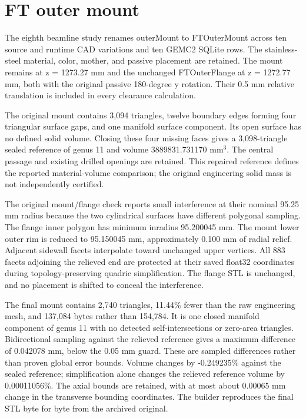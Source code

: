 \FloatBarrier
\section{FT outer mount}
\label{sec:outer-mount}

The eighth beamline study renames outerMount to FTOuterMount across ten source and runtime CAD variations
and ten GEMC2 SQLite rows. The stainless-steel material, color, mother, and passive placement are retained.
The mount remains at z = 1273.27 mm and the unchanged FTOuterFlange at z = 1272.77 mm, both with the
original passive 180-degree y rotation. Their 0.5 mm relative translation is included in every clearance
calculation.

The original mount contains 3,094 triangles, twelve boundary edges forming four triangular surface gaps, and
one manifold surface component. Its open surface has no defined solid volume. Closing these four missing
faces gives a 3,098-triangle sealed reference of genus 11 and volume 3889831.731170 mm$^3$. The central
passage and existing drilled openings are retained. This repaired reference defines the reported
material-volume comparison; the original engineering solid mass is not independently certified.

The original mount/flange check reports small interference at their nominal 95.25 mm radius because the two
cylindrical surfaces have different polygonal sampling. The flange inner polygon has minimum inradius
95.200045 mm. The mount lower outer rim is reduced to 95.150045 mm, approximately 0.100 mm of radial relief.
Adjacent sidewall facets interpolate toward unchanged upper vertices. All 883 facets adjoining the relieved
end are protected at their saved float32 coordinates during topology-preserving quadric simplification. The
flange STL is unchanged, and no placement is shifted to conceal the interference.

The final mount contains 2,740 triangles, 11.44\% fewer than the raw engineering mesh, and 137,084 bytes
rather than 154,784. It is one closed manifold component of genus 11 with no detected self-intersections or
zero-area triangles. Bidirectional sampling against the relieved reference gives a maximum difference of
0.042078 mm, below the 0.05 mm guard. These are sampled differences rather than proven global error bounds.
Volume changes by -0.249235\% against the sealed reference; simplification alone changes the relieved
reference volume by 0.00011056\%. The axial bounds are retained, with at most about 0.00065 mm change in the
transverse bounding coordinates. The builder reproduces the final STL byte for byte from the archived
original.


